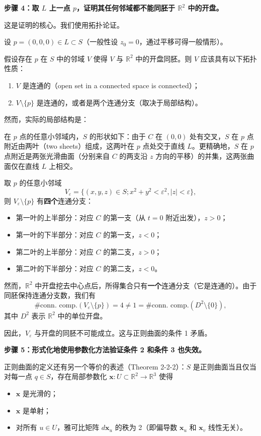 \begin{solution}
\vspace{1ex}
\noindent\textbf{步骤 4：取 $L$ 上一点 $p$，证明其任何邻域都不能同胚于 $\mathbb{R}^2$ 中的开盘。}

这是证明的核心。我们使用拓扑论证。

设 $p = (0, 0, 0) \in L \subset S$（一般性设 $z_0 = 0$，通过平移可得一般情形）。

假设存在 $p$ 在 $S$ 中的邻域 $V$ 使得 $V$ 与 $\mathbb{R}^2$ 中的开盘同胚。则 $V$ 应该具有以下拓扑性质：
\begin{enumerate}
\item $V$ 是连通的（open set in a connected space is connected）；
\item $V \setminus \{p\}$ 是连通的，或者是两个连通分支（取决于局部结构）。
\end{enumerate}

然而，实际的局部结构是：

在 $p$ 点的任意小邻域内，$S$ 的形状如下：由于 $C$ 在 $(0, 0)$ 处有交叉，$S$ 在 $p$ 点附近由两叶（two sheets）组成，这两叶在 $p$ 点处交于直线 $L$。更精确地，$S$ 在 $p$ 点附近是两张光滑曲面（分别来自 $C$ 的两支沿 $z$ 方向的平移）的并集，这两张曲面仅在直线 $L$ 上相交。

取 $p$ 的任意小邻域
\[
V_\varepsilon = \{(x, y, z) \in S ; x^2 + y^2 < \varepsilon^2, |z| < \varepsilon\},
\]
则 $V_\varepsilon \setminus \{p\}$ 有\textbf{四个}连通分支：
\begin{itemize}
\item 第一叶的上半部分：对应 $C$ 的第一支（从 $t=0$ 附近出发），$z > 0$；
\item 第一叶的下半部分：对应 $C$ 的第一支，$z < 0$；
\item 第二叶的上半部分：对应 $C$ 的第二支，$z > 0$；
\item 第二叶的下半部分：对应 $C$ 的第二支，$z < 0$。
\end{itemize}

然而，$\mathbb{R}^2$ 中开盘挖去中心点后，所得集合只有\textbf{一个}连通分支（它是连通的）。由于同胚保持连通分支数，我们有
\[
\#\text{conn. comp.}(V_\varepsilon \setminus \{p\}) = 4 \neq 1 = \#\text{conn. comp.}(D^2 \setminus \{0\}),
\]
其中 $D^2$ 表示 $\mathbb{R}^2$ 中的单位开盘。

因此，$V_\varepsilon$ 与开盘的同胚不可能成立。这与正则曲面的条件 1 矛盾。

\vspace{1ex}
\noindent\textbf{步骤 5：形式化地使用参数化方法验证条件 2 和条件 3 也失效。}

正则曲面的定义还有另一个等价的表述（Theorem 2-2-2）：$S$ 是正则曲面当且仅当对每一点 $q \in S$，存在局部参数化 $\mathbf{x} : U \subset \mathbb{R}^2 \to \mathbb{R}^3$ 使得
\begin{itemize}
\item $\mathbf{x}$ 是光滑的；
\item $\mathbf{x}$ 是单射；
\item 对所有 $u \in U$，雅可比矩阵 $d\mathbf{x}_u$ 的秩为 2（即偏导数 $\mathbf{x}_u$ 和 $\mathbf{x}_v$ 线性无关）。
\end{itemize}


\end{solution}
